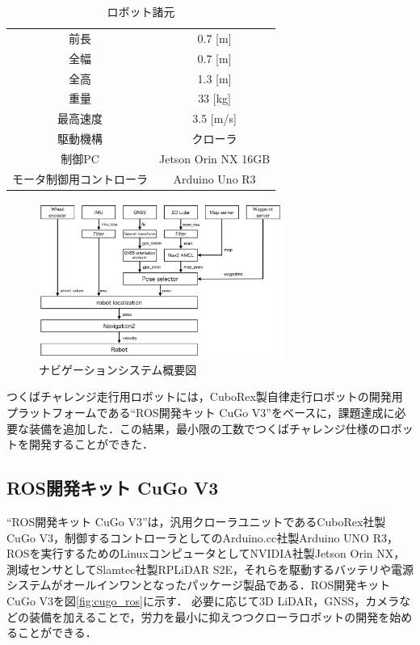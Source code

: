 \documentclass[platex,dvipdfmx]{rbproceedings}
\begin{document}
\begin{table}[bth]
    \centering
    \caption{ロボット諸元}
    \label{tab:cugo_ros_tsukuba_spec}
    \begin{tabular}{cc}
        \hline
        前長     & 0.7 [m] \\
        全幅     & 0.7 [m] \\
        全高     & 1.3 [m] \\
        重量     & 33  [kg] \\
        最高速度 & 3.5 [m/s] \\
        駆動機構 & クローラ \\
        制御PC   & Jetson Orin NX 16GB \\
        モータ制御用コントローラ & Arduino Uno R3 \\
        \hline
    \end{tabular}
\end{table}

\begin{figure}[h]
    \centering   
    \includegraphics[keepaspectratio,width=80mm]{fig/system.png}
    \caption{ナビゲーションシステム概要図}
    \label{fig:system}
\end{figure}



つくばチャレンジ走行用ロボットには，CuboRex製自律走行ロボットの開発用プラットフォームである“ROS開発キット CuGo V3”をベースに，課題達成に必要な装備を追加した．この結果，最小限の工数でつくばチャレンジ仕様のロボットを開発することができた．

\subsection{ROS開発キット CuGo V3}
“ROS開発キット CuGo V3”は，汎用クローラユニットであるCuboRex社製CuGo V3，制御するコントローラとしてのArduino.cc社製Arduino UNO R3，ROSを実行するためのLinuxコンピュータとしてNVIDIA社製Jetson Orin NX，測域センサとしてSlamtec社製RPLiDAR S2E，それらを駆動するバッテリや電源システムがオールインワンとなったパッケージ製品である．ROS開発キット CuGo V3を図\ref{fig:cugo_ros}に示す．
必要に応じて3D LiDAR，GNSS，カメラなどの装備を加えることで，労力を最小に抑えつつクローラロボットの開発を始めることができる．
\end{document}
